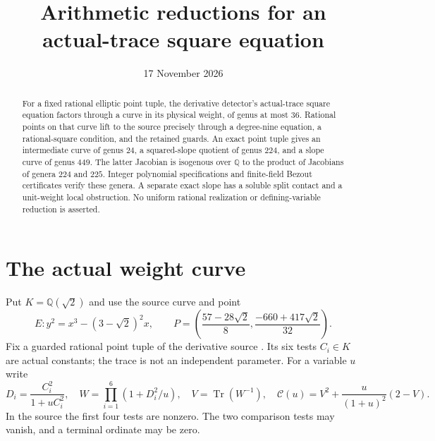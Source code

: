 \documentclass[11pt,a4paper]{article}
\title{Arithmetic reductions for an actual-trace square equation}
\author{}\date{17 November 2026}
\newcommand{\Q}{\mathbb Q}
\DeclareMathOperator{\Tr}{Tr}
\begin{document}
\maketitle
\begin{abstract}
For a fixed rational elliptic point tuple, the derivative detector's
actual-trace square equation factors through a curve in its physical
weight, of genus at most $36$. Rational points on that curve lift to
the source precisely through a degree-nine equation, a rational-square
condition, and the retained guards. An exact point tuple gives an
intermediate curve of genus $24$, a squared-slope quotient of genus
$224$, and a slope curve of genus $449$. The latter Jacobian is
isogenous over $\Q$ to the product of Jacobians of genera $224$
and $225$. Integer polynomial specifications and finite-field Bezout
certificates verify these genera. A separate exact slope has a soluble
split contact and a unit-weight local obstruction. No uniform rational
realization or defining-variable reduction is asserted.
\end{abstract}

\section{The actual weight curve}

Put $K=\Q(\sqrt2)$ and use the source curve and point
\[
 E:y^2=x^3-(3-\sqrt2)^2x,\qquad
 P=\left(\frac{57-28\sqrt2}{8},\frac{-660+417\sqrt2}{32}\right).
\]
Fix a guarded rational point tuple of the derivative source
\cite{Derivative,Criterion}. Its six tests $C_i\in K$ are actual
constants; the trace is not an independent parameter. For a variable
$u$ write
\begin{equation}\label{eq:actual}
 D_i=\frac{C_i^2}{1+uC_i^2},\quad
 W=\prod_{i=1}^6(1+D_i^2/u),\quad
 V=\Tr(W^{-1}),\quad
 \mathcal C(u)=V^2+\frac{u}{(1+u)^2}(2-V).
\end{equation}
In the source the first four tests are nonzero. The two comparison
tests may vanish, and a terminal ordinate may be zero.
\end{document}
